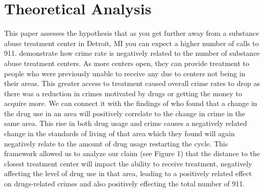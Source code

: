 \documentclass[12pt]{article}
\begin{document}
\section{Theoretical Analysis}
\label{sec:theory}
This paper assesses the hypothesis that as you get further away from a substance abuse treatment center in Detroit, MI you can expect a higher number of calls to 911. \cite{SAT_centers_and_crime} demonstrate how crime rate is negatively related to the number of substance abuse treatment centers. As more centers open, they can provide treatment to people who were previously unable to receive any due to centers not being in their areas. This greater access to treatment caused overall crime rates to drop as there was a reduction in crimes motivated by drugs or getting the money to acquire more. We can connect it with the findings of \cite{drugs_and_crime} who found that a change in the drug use in an area will positively correlate to the change in crime in the same area. This rise in both drug usage and crime causes a negatively related change in the standards of living of that area which they found will again negatively relate to the amount of drug usage restarting the cycle. This framework allowed us to analyze our claim (see Figure 1) that the distance to the closest treatment center will impact the ability to receive treatment, negatively affecting the level of drug use in that area, leading to a positively related effect on drugs-related crimes and also positively effecting the total number of 911. 
\vspace{0.5cm}
\begin{figure}[h!]
\caption{} 
\vspace{0.5cm}
\end{figure}
\end{document}
